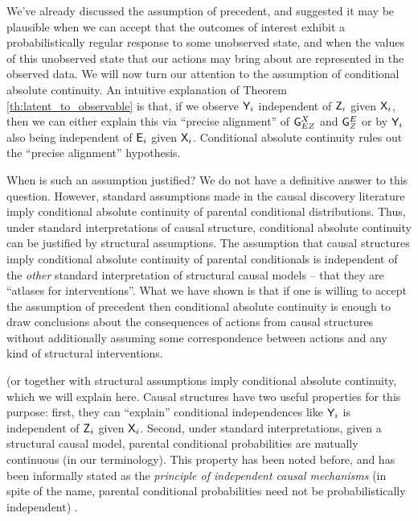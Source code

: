 We've already discussed the assumption of precedent, and suggested it may be plausible when we can accept that the outcomes of interest exhibit a probabilistically regular response to some unobserved state, and when the values of this unobserved state that our actions may bring about are represented in the observed data. We will now turn our attention to the assumption of conditional absolute continuity. An intuitive explanation of Theorem \ref{th:latent_to_observable} is that, if we observe $\mathsf{Y}_i$ independent of $\mathsf{Z}_i$ given $\mathsf{X}_i$, then we can either explain this via ``precise alignment'' of $\mathsf{G}^{X}_{EZ}$ and $\mathsf{G}^{E}_{Z}$ or by $\mathsf{Y}_i$ also being independent of $\mathsf{E}_i$ given $\mathsf{X}_i$. Conditional absolute continuity rules out the ``precise alignment'' hypothesis.

When is such an assumption justified? We do not have a definitive answer to this question. However, standard assumptions made in the causal discovery literature imply conditional absolute continuity of parental conditional distributions. Thus, under standard interpretations of causal structure, conditional absolute continuity can be justified by structural assumptions. The assumption that causal structures imply conditional absolute continuity of parental conditionals is independent of the \emph{other} standard interpretation of structural causal models -- that they are ``atlases for interventions''. What we have shown is that if one is willing to accept the assumption of precedent then conditional absolute continuity is enough to draw conclusions about the consequences of actions from causal structures without additionally assuming some correspondence between actions and any kind of structural interventions.



 (or together with structural assumptions imply conditional absolute continuity, which we will explain here. Causal structures have two useful properties for this purpose: first, they can ``explain'' conditional independences like $\mathsf{Y}_i$ is independent of $\mathsf{Z}_i$ given $\mathsf{X}_i$. Second, under standard interpretations, given a structural causal model, parental conditional probabilities are mutually continuous (in our terminology). This property has been noted before, and has been informally stated as the \emph{principle of independent causal mechanisms} (in spite of the name, parental conditional probabilities need not be probabilistically independent) \citep{lemeire_replacing_2013,peters_elements_2017}.

